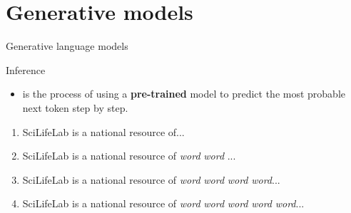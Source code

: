 \documentclass[10pt]{beamer}
\newcommand{\feature}[1]{{\color{scLime} \textbf{#1}}}
\begin{document}

\section{Generative models}


\begin{frame}{Generative language models}
	\begin{exampleblock}{Inference}
		\begin{itemize}
			\item is the process of using a \feature{pre-trained} model to predict the most probable next token step by step.
		\end{itemize}
	\end{exampleblock}
	\begin{enumerate}
		\item SciLifeLab is a national resource of...
		\item SciLifeLab is a national resource of \emph{word} \emph{word} ...
		\item SciLifeLab is a national resource of \emph{word} \emph{word} \emph{word} \emph{word}...
		\item SciLifeLab is a national resource of \emph{word} \emph{word} \emph{word} \emph{word} \emph{word}...
	\end{enumerate}
\end{frame}
\end{document}
